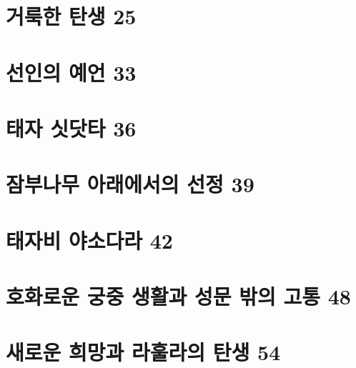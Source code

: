 \documentclass[12pt, a4paper, oneside]{book}
\let\stdsection\section
\renewcommand\section{\newpage\stdsection}
\begin{document}
%
	\section{거룩한 탄생 25 }

%
	\section{선인의 예언 33 }

%
	\section{태자 싯닷타 36 }

%
	\section{잠부나무 아래에서의 선정 39 }

%
	\section{ 태자비 야소다라 42 }

%
	\section{호화로운 궁중 생활과 성문 밖의 고통 48 }

%
	\section{새로운 희망과 라훌라의 탄생 54}
\end{document}
